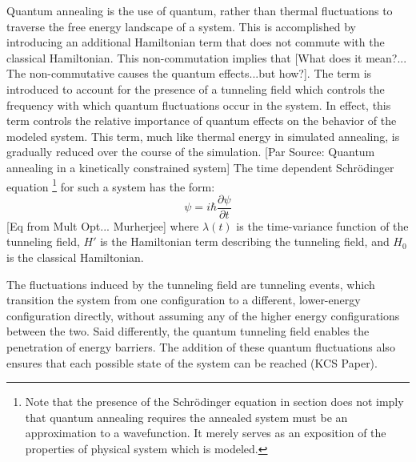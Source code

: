 \documentclass[11pt]{afthesis}
\begin{document}
Quantum annealing is the use of quantum, rather than thermal fluctuations to traverse the free energy landscape of a system. This is accomplished by introducing an additional Hamiltonian term that does not commute with the classical Hamiltonian. This non-commutation implies that [What does it mean?... The non-commutative causes the quantum effects...but how?].  The term is introduced to account for the presence of a tunneling field which controls the frequency with which quantum fluctuations occur in the system. In effect, this term controls the relative importance of quantum effects on the behavior of the modeled system. This term, much like thermal energy in simulated annealing, is gradually reduced over the course of the simulation. [Par Source: Quantum annealing in a kinetically constrained system] The time dependent Schrödinger equation \footnote{Note that the presence of the Schrödinger equation in section does not imply that quantum annealing requires the annealed system must be an approximation to a wavefunction. It merely serves as an exposition of the properties of physical system which is modeled.} for such a system has the form: \begin{equation}
[\lambda(t)H' + H_0]\psi = i\hbar \frac{\partial \psi}{\partial t}
\end{equation} [Eq from Mult Opt... Murherjee] where \begin{math} \lambda(t) \end{math} is the time-variance function of the tunneling field, \begin{math} H' \end{math} is the Hamiltonian term describing the tunneling field, and \begin{math} H_0 \end{math} is the classical Hamiltonian. 

The fluctuations induced by the tunneling field are tunneling events, which transition the system from one configuration to a different, lower-energy configuration directly, without assuming any of the higher energy configurations between the two. Said differently, the quantum tunneling field enables the penetration of energy barriers. The addition of these quantum fluctuations also ensures that each possible state of the system can be reached (KCS Paper). 


\end{document}
